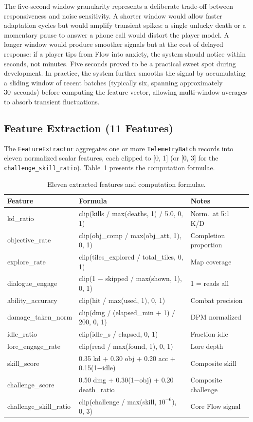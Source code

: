 The five-second window granularity represents a deliberate trade-off between responsiveness and noise sensitivity. A shorter window would allow faster adaptation cycles but would amplify transient spikes: a single unlucky death or a momentary pause to answer a phone call would distort the player model. A longer window would produce smoother signals but at the cost of delayed response: if a player tips from Flow into anxiety, the system should notice within seconds, not minutes. Five seconds proved to be a practical sweet spot during development. In practice, the system further smooths the signal by accumulating a sliding window of recent batches (typically six, spanning approximately 30~seconds) before computing the feature vector, allowing multi-window averages to absorb transient fluctuations.

\subsection{Feature Extraction (11 Features)}

The \texttt{FeatureExtractor} aggregates one or more \texttt{TelemetryBatch} records into eleven normalized scalar features, each clipped to [0, 1] (or [0, 3] for the \texttt{challenge\_skill\_ratio}). Table~\ref{tab:features} presents the computation formulae.

\begin{table}[H]
\centering
\caption{Eleven extracted features and computation formulae.}
\label{tab:features}
\small
\begin{tabular}{@{}p{3.5cm} p{6cm} p{3.5cm}@{}}
\toprule
\textbf{Feature} & \textbf{Formula} & \textbf{Notes} \\
\midrule
kd\_ratio & clip(kills / max(deaths, 1) / 5.0, 0, 1) & Norm.\ at 5:1 K/D \\
objective\_rate & clip(obj\_comp / max(obj\_att, 1), 0, 1) & Completion proportion \\
explore\_rate & clip(tiles\_explored / total\_tiles, 0, 1) & Map coverage \\
dialogue\_engage & clip(1 $-$ skipped / max(shown, 1), 0, 1) & 1 = reads all \\
ability\_accuracy & clip(hit / max(used, 1), 0, 1) & Combat precision \\
damage\_taken\_norm & clip(dmg / (elapsed\_min + 1) / 200, 0, 1) & DPM normalized \\
idle\_ratio & clip(idle\_s / elapsed, 0, 1) & Fraction idle \\
lore\_engage\_rate & clip(read / max(found, 1), 0, 1) & Lore depth \\
skill\_score & 0.35 kd + 0.30 obj + 0.20 acc + 0.15(1$-$idle) & Composite skill \\
challenge\_score & 0.50 dmg + 0.30(1$-$obj) + 0.20 death\_ratio & Composite challenge \\
challenge\_skill\_ratio & clip(challenge / max(skill, $10^{-6}$), 0, 3) & Core Flow signal \\
\bottomrule
\end{tabular}
\end{table}

